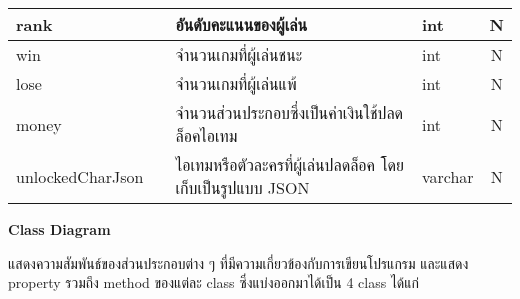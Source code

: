 \documentclass[12pt,oneside,openright,a4paper]{cpe-thai-project}
\begin{document}
\begin{table}[H]
\begin{tabular}{|l|c|l|l|c|}
  \rowcolor[HTML]{FFFFFF} 
  rank                                                             &              & อันดับคะแนนของผู้เล่น                                             & int                                                                                                                 & N                                                              \\ \hline
  \rowcolor[HTML]{FFFFFF} 
  win                                                              &              & จำนวนเกมที่ผู้เล่นชนะ                                             & int                                                                                                                 & N                                                              \\ \hline
  \rowcolor[HTML]{FFFFFF} 
  lose                                                             &              & จำนวนเกมที่ผู้เล่นแพ้                                             & int                                                                                                                 & N                                                              \\ \hline
  \rowcolor[HTML]{FFFFFF} 
  money                                                            &              & จำนวนส่วนประกอบซึ่งเป็นค่าเงินใช้ปลดล็อคไอเทม                     & int                                                                                                                 & N                                                              \\ \hline
  \rowcolor[HTML]{FFFFFF} 
  unlockedCharJson                                                 &              & ไอเทมหรือตัวละครที่ผู้เล่นปลดล็อค โดยเก็บเป็นรูปแบบ JSON          & varchar                                                                                                             & N                                                              \\ \hline
  \end{tabular}
\end{table}

\pagebreak
\textbf{Class Diagram}

แสดงความสัมพันธ์ของส่วนประกอบต่าง ๆ ที่มีความเกี่ยวข้องกับการเขียนโปรแกรม 
และแสดง property รวมถึง method ของแต่ละ class ซึ่งแบ่งออกมาได้เป็น 4 class ได้แก่
\end{document}
